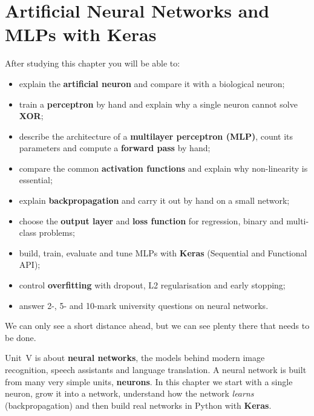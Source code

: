 \chapter{Artificial Neural Networks and MLPs with Keras}
\label{ch:ann}


\begin{objectives}
After studying this chapter you will be able to:
\begin{itemize}
  \item explain the \textbf{artificial neuron} and compare it with a biological neuron;
  \item train a \textbf{perceptron} by hand and explain why a single neuron cannot solve \textbf{XOR};
  \item describe the architecture of a \textbf{multilayer perceptron (MLP)}, count its parameters and compute a \textbf{forward pass} by hand;
  \item compare the common \textbf{activation functions} and explain why non-linearity is essential;
  \item explain \textbf{backpropagation} and carry it out by hand on a small network;
  \item choose the \textbf{output layer} and \textbf{loss function} for regression, binary and multi-class problems;
  \item build, train, evaluate and tune MLPs with \textbf{Keras} (Sequential and Functional API);
  \item control \textbf{overfitting} with dropout, L2 regularisation and early stopping;
  \item answer 2-, 5- and 10-mark university questions on neural networks.
\end{itemize}
\end{objectives}

\begin{pullquote}
We can only see a short distance ahead, but we can see plenty there that needs to be done.
\end{pullquote}

Unit~V is about \textbf{neural networks}, the models behind modern image recognition, speech assistants and language translation. A neural network is built from many very simple units, \textbf{neurons}. In this chapter we start with a single neuron, grow it into a network, understand how the network \emph{learns} (backpropagation) and then build real networks in Python with \textbf{Keras}.

